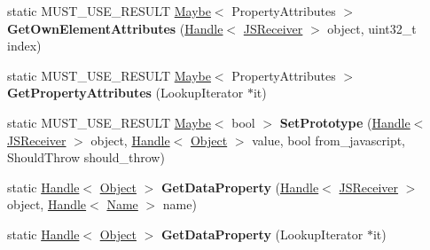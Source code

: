 \begin{DoxyCompactItemize}
\item 
static M\+U\+S\+T\+\_\+\+U\+S\+E\+\_\+\+R\+E\+S\+U\+LT \hyperlink{classv8_1_1_maybe}{Maybe}$<$ Property\+Attributes $>$ {\bfseries Get\+Own\+Element\+Attributes} (\hyperlink{classv8_1_1internal_1_1_handle}{Handle}$<$ \hyperlink{classv8_1_1internal_1_1_j_s_receiver}{J\+S\+Receiver} $>$ object, uint32\+\_\+t index)\hypertarget{classv8_1_1internal_1_1_j_s_receiver_acea2ac0725586bb0c21f94f345bb78b3}{}\label{classv8_1_1internal_1_1_j_s_receiver_acea2ac0725586bb0c21f94f345bb78b3}

\item 
static M\+U\+S\+T\+\_\+\+U\+S\+E\+\_\+\+R\+E\+S\+U\+LT \hyperlink{classv8_1_1_maybe}{Maybe}$<$ Property\+Attributes $>$ {\bfseries Get\+Property\+Attributes} (Lookup\+Iterator $\ast$it)\hypertarget{classv8_1_1internal_1_1_j_s_receiver_a8fd15767acd469d4de9243af795c8919}{}\label{classv8_1_1internal_1_1_j_s_receiver_a8fd15767acd469d4de9243af795c8919}

\item 
static M\+U\+S\+T\+\_\+\+U\+S\+E\+\_\+\+R\+E\+S\+U\+LT \hyperlink{classv8_1_1_maybe}{Maybe}$<$ bool $>$ {\bfseries Set\+Prototype} (\hyperlink{classv8_1_1internal_1_1_handle}{Handle}$<$ \hyperlink{classv8_1_1internal_1_1_j_s_receiver}{J\+S\+Receiver} $>$ object, \hyperlink{classv8_1_1internal_1_1_handle}{Handle}$<$ \hyperlink{classv8_1_1internal_1_1_object}{Object} $>$ value, bool from\+\_\+javascript, Should\+Throw should\+\_\+throw)\hypertarget{classv8_1_1internal_1_1_j_s_receiver_a5d96a611eff400c3c4f0736dc39bea5d}{}\label{classv8_1_1internal_1_1_j_s_receiver_a5d96a611eff400c3c4f0736dc39bea5d}

\item 
static \hyperlink{classv8_1_1internal_1_1_handle}{Handle}$<$ \hyperlink{classv8_1_1internal_1_1_object}{Object} $>$ {\bfseries Get\+Data\+Property} (\hyperlink{classv8_1_1internal_1_1_handle}{Handle}$<$ \hyperlink{classv8_1_1internal_1_1_j_s_receiver}{J\+S\+Receiver} $>$ object, \hyperlink{classv8_1_1internal_1_1_handle}{Handle}$<$ \hyperlink{classv8_1_1internal_1_1_name}{Name} $>$ name)\hypertarget{classv8_1_1internal_1_1_j_s_receiver_a6dc272e4dc8ae20fab8987949192dd9c}{}\label{classv8_1_1internal_1_1_j_s_receiver_a6dc272e4dc8ae20fab8987949192dd9c}

\item 
static \hyperlink{classv8_1_1internal_1_1_handle}{Handle}$<$ \hyperlink{classv8_1_1internal_1_1_object}{Object} $>$ {\bfseries Get\+Data\+Property} (Lookup\+Iterator $\ast$it)\hypertarget{classv8_1_1internal_1_1_j_s_receiver_a3f4d335c7ea9dd2552f1e8b268e1a3b8}{}\label{classv8_1_1internal_1_1_j_s_receiver_a3f4d335c7ea9dd2552f1e8b268e1a3b8}


\end{DoxyCompactItemize}
